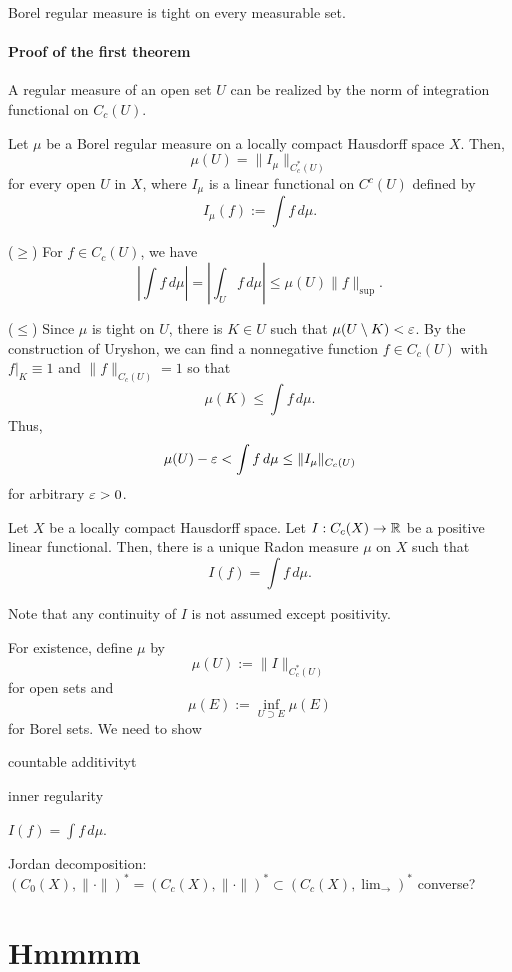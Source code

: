 \documentclass{../crs}
\begin{document}
Borel regular measure is tight on every measurable set.


\subsubsection{Proof of the first theorem}
A regular measure of an open set $U$ can be realized by the norm of integration functional on $C_c(U)$.
\begin{lem}
Let $\mu$ be a Borel regular measure on a locally compact Hausdorff space $X$.
Then,
\[\mu(U)=\|I_\mu\|_{C_c^*(U)}\]
for every open $U$ in $X$, where $I_\mu$ is a linear functional on $C^c(U)$ defined by
\[I_\mu(f):=\int f\,d\mu.\]
\end{lem}
\begin{pf}
($\ge$)
For $f\in C_c(U)$, we have
\[|\int f\,d\mu|=|\int_Uf\,d\mu|\le\mu(U)\|f\|_{\sup}.\]

($\le$)
Since $\mu$ is tight on $U$, there is $K\in U$ such that $\mu(U\setminus K)<\varepsilon$.
By the construction of Uryshon, we can find a nonnegative function $f\in C_c(U)$ with $f|_K \equiv 1$ and $\|f\|_{C_c(U)} = 1$ so that
\[\mu(K) \le \int f\,d\mu. \]
Thus,
\[ \mu(U)-\varepsilon < \int f\,d\mu \le \|I_\mu\|_{C_c(U)} \]
for arbitrary $\varepsilon>0$.
\end{pf}

\begin{thm}
Let $X$ be a locally compact Hausdorff space.
Let $I:C_c(X)\to\R$ be a positive linear functional.
Then, there is a unique Radon measure $\mu$ on $X$ such that
\[I(f)=\int f\,d\mu.\]
\end{thm}
Note that any continuity of $I$ is not assumed except positivity.
\begin{pf}
For existence, define $\mu$ by
\[ \mu(U) := \|I\|_{C_c^*(U)} \]
for open sets and
\[ \mu(E) := \inf_{U\supset E}\mu(E)\]
for Borel sets.
We need to show
\begin{cond}
\item countable additivityt
\item inner regularity
\item $I(f)=\int f\,d\mu$.
\end{cond}
\end{pf}

Jordan decomposition: $(C_0(X),\|\cdot\|)^*=(C_c(X),\|\cdot\|)^*\subset(C_c(X),\lim_{\to})^*$
converse?




\chapter{Hmmmm}
\end{document}
